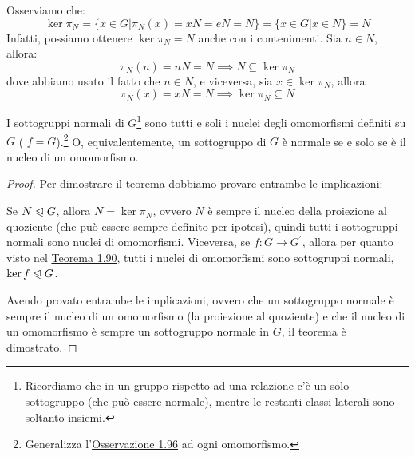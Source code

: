 \documentclass[11pt]{scrartcl}
\begin{document}
\begin{remark}
[$\ker \pi_N$]
\label{g:ker}
Osserviamo che: \[\ker \pi_N = \{x \in G | \pi_N(x)=xN=eN=N\}=\{x \in G | x \in N\} = N\]
Infatti, possiamo ottenere $\ker \pi_N = N$ anche con i contenimenti. Sia $n \in N$, allora:
	\[ \pi_N(n)=nN=N \implies N \subseteq \ker \pi_N
	\]
dove abbiamo usato il fatto che $n \in N$, e viceversa, sia $x \in \ker \pi_N$, allora
	\[ \pi_N(x)=xN=N \implies \ker \pi_N \subseteq N\]
\end{remark}

\begin{corollary}
I sottogruppi normali di $G$\footnote{Ricordiamo che in un gruppo rispetto ad una relazione c'è un solo sottogruppo (che può essere normale), mentre le restanti classi laterali sono soltanto insiemi.} sono tutti e soli i nuclei degli omomorfismi definiti su $G$ ( $f=G$).\footnote{Generalizza l'\hyperref[g:ker]{Osservazione 1.96} ad ogni omomorfismo.} O, equivalentemente, un sottogruppo di $G$ è normale se e solo se è il nucleo di un omomorfismo.
\end{corollary}

\begin{proof}
Per dimostrare il teorema dobbiamo provare entrambe le implicazioni:
	\begin{enumerate}[(a)]
	\ii Se $N \trianglelefteqslant G$, allora $N=\ker \pi_N$, ovvero $N$ è sempre il nucleo della proiezione al quoziente (che può essere sempre definito per ipotesi), quindi tutti i sottogruppi normali sono nuclei di omomorfismi.
	\ii Viceversa, se $f: G \longrightarrow G^{\prime}$, allora per quanto visto nel \hyperref[g:sgrnker]{Teorema 1.90}, tutti i nuclei di omomorfismi sono sottogruppi normali, $\ker f \trianglelefteqslant G$.
	\end{enumerate}
Avendo provato entrambe le implicazioni, ovvero che un sottogruppo normale è sempre il nucleo di un omomorfismo (la proiezione al quoziente) e che il nucleo di un omomorfismo è sempre un sottogruppo normale in $G$, il teorema è dimostrato.
\end{proof}

\newpage
\end{document}
